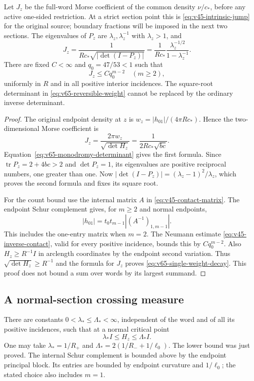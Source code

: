 \begin{theorem}
\label{thm:v65-reversible-weight}
Let $J_z$ be the full-word Morse coefficient of the common density
$\nu/c_*$, before any active one-sided restriction. At a strict
section point this is \eqref{eq:v45-intrinsic-jump} for the original
source; boundary fractions will be imposed in the next two sections.
The eigenvalues of $P_z$ are $\lambda_z,\lambda_z^{-1}$ with
$\lambda_z>1$, and
\begin{equation}\label{eq:v65-reversible-weight}
 J_z=\frac{1}{R c_*\sqrt{|\det(I-P_z)|}}
     =\frac{1}{R c_*}
        \frac{\lambda_z^{-1/2}}{1-\lambda_z^{-1}}.
\end{equation}
There are fixed $C<\infty$ and $q_0=47/53<1$ such that
\begin{equation}\label{eq:v65-single-weight-decay}
 J_z\le Cq_0^{m-2}\quad(m\ge2),
\end{equation}
uniformly in $R$ and in all positive interior incidences.
The square-root determinant in \eqref{eq:v65-reversible-weight}
cannot be replaced by the ordinary inverse determinant.
\end{theorem}
\begin{proof}
The original endpoint density at $z$ is
$w_z=|h_{01}|/(4\pi R c_*)$. Hence the two-dimensional Morse
coefficient is
\[
 J_z=\frac{2\pi w_z}{\sqrt{\det H_z}}
     =\frac{1}{2R c_*\sqrt{bc}}.
\]
Equation~\eqref{eq:v65-monodromy-determinant} gives the first formula.
Since $\operatorname{tr}P_z=2+4bc>2$ and $\det P_z=1$, its
eigenvalues are positive reciprocal numbers, one greater than one.
Now $|\det(I-P_z)|=(\lambda_z-1)^2/\lambda_z$, which proves the
second formula and fixes its square root.

For the count bound use the internal matrix $A$ in
\eqref{eq:v45-contact-matrix}. The endpoint Schur complement gives,
for $m\ge2$ and normal endpoints,
\[
 |h_{01}|=t_0t_{m-1}|(A^{-1})_{1,m-1}|.
\]
This includes the one-entry matrix when $m=2$. The Neumann estimate
\eqref{eq:v45-inverse-contact}, valid for every positive incidence,
bounds this by $Cq_0^{m-2}$. Also
$H_z\ge R^{-1}I$ in arclength coordinates by the endpoint second
variation. Thus $\sqrt{\det H_z}\ge R^{-1}$ and the formula for
$J_z$ proves \eqref{eq:v65-single-weight-decay}. This proof does
not bound a sum over words by its largest summand.
\end{proof}

\subsection{A normal-section crossing measure}
There are constants $0<\lambda_*\le\Lambda_*<\infty$, independent
of the word and of all its positive incidences, such that at a normal
critical point
\begin{equation}\label{eq:v65-normal-hessian-bounds}
 \lambda_* I\le H_z\le\Lambda_* I.
\end{equation}
One may take $\lambda_*=1/R_+$ and
$\Lambda_*=2(1/R_-+1/\ell_0)$. The lower bound was just proved.
The internal Schur complement is bounded above by the endpoint
principal block. Its entries are bounded by endpoint curvature and
$1/\ell_0$; the stated choice also includes $m=1$.

